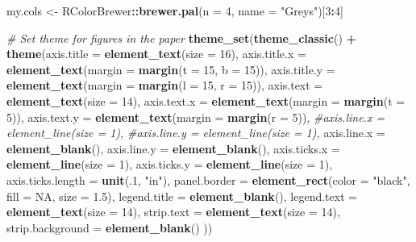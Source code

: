 \documentclass[]{article}
\newenvironment{Shaded}{\begin{snugshade}}{\end{snugshade}}
\newcommand{\CommentTok}[1]{\textcolor[rgb]{0.56,0.35,0.01}{\textit{#1}}}
\newcommand{\DataTypeTok}[1]{\textcolor[rgb]{0.13,0.29,0.53}{#1}}
\newcommand{\DecValTok}[1]{\textcolor[rgb]{0.00,0.00,0.81}{#1}}
\newcommand{\FloatTok}[1]{\textcolor[rgb]{0.00,0.00,0.81}{#1}}
\newcommand{\KeywordTok}[1]{\textcolor[rgb]{0.13,0.29,0.53}{\textbf{#1}}}
\newcommand{\NormalTok}[1]{#1}
\newcommand{\OperatorTok}[1]{\textcolor[rgb]{0.81,0.36,0.00}{\textbf{#1}}}
\newcommand{\OtherTok}[1]{\textcolor[rgb]{0.56,0.35,0.01}{#1}}
\newcommand{\StringTok}[1]{\textcolor[rgb]{0.31,0.60,0.02}{#1}}
\begin{document}
\begin{Shaded}
\begin{Highlighting}[]
\NormalTok{my.cols <-}\StringTok{ }\NormalTok{RColorBrewer}\OperatorTok{::}\KeywordTok{brewer.pal}\NormalTok{(}\DataTypeTok{n =} \DecValTok{4}\NormalTok{, }\DataTypeTok{name =} \StringTok{"Greys"}\NormalTok{)[}\DecValTok{3}\OperatorTok{:}\DecValTok{4}\NormalTok{]}

\CommentTok{# Set theme for figures in the paper}
\KeywordTok{theme_set}\NormalTok{(}\KeywordTok{theme_classic}\NormalTok{() }\OperatorTok{+}\StringTok{ }
\StringTok{  }\KeywordTok{theme}\NormalTok{(}\DataTypeTok{axis.title =} \KeywordTok{element_text}\NormalTok{(}\DataTypeTok{size =} \DecValTok{16}\NormalTok{),}
        \DataTypeTok{axis.title.x =} \KeywordTok{element_text}\NormalTok{(}\DataTypeTok{margin =} \KeywordTok{margin}\NormalTok{(}\DataTypeTok{t =} \DecValTok{15}\NormalTok{, }\DataTypeTok{b =} \DecValTok{15}\NormalTok{)),}
        \DataTypeTok{axis.title.y =} \KeywordTok{element_text}\NormalTok{(}\DataTypeTok{margin =} \KeywordTok{margin}\NormalTok{(}\DataTypeTok{l =} \DecValTok{15}\NormalTok{, }\DataTypeTok{r =} \DecValTok{15}\NormalTok{)),}
        \DataTypeTok{axis.text =} \KeywordTok{element_text}\NormalTok{(}\DataTypeTok{size =} \DecValTok{14}\NormalTok{),}
        \DataTypeTok{axis.text.x =} \KeywordTok{element_text}\NormalTok{(}\DataTypeTok{margin =} \KeywordTok{margin}\NormalTok{(}\DataTypeTok{t =} \DecValTok{5}\NormalTok{)),}
        \DataTypeTok{axis.text.y =} \KeywordTok{element_text}\NormalTok{(}\DataTypeTok{margin =} \KeywordTok{margin}\NormalTok{(}\DataTypeTok{r =} \DecValTok{5}\NormalTok{)),}
        \CommentTok{#axis.line.x = element_line(size = 1),}
        \CommentTok{#axis.line.y = element_line(size = 1),}
        \DataTypeTok{axis.line.x =} \KeywordTok{element_blank}\NormalTok{(),}
        \DataTypeTok{axis.line.y =} \KeywordTok{element_blank}\NormalTok{(),}
        \DataTypeTok{axis.ticks.x =} \KeywordTok{element_line}\NormalTok{(}\DataTypeTok{size =} \DecValTok{1}\NormalTok{),}
        \DataTypeTok{axis.ticks.y =} \KeywordTok{element_line}\NormalTok{(}\DataTypeTok{size =} \DecValTok{1}\NormalTok{),}
        \DataTypeTok{axis.ticks.length =} \KeywordTok{unit}\NormalTok{(.}\DecValTok{1}\NormalTok{, }\StringTok{"in"}\NormalTok{),}
        \DataTypeTok{panel.border =} \KeywordTok{element_rect}\NormalTok{(}\DataTypeTok{color =} \StringTok{"black"}\NormalTok{, }\DataTypeTok{fill =} \OtherTok{NA}\NormalTok{, }\DataTypeTok{size =} \FloatTok{1.5}\NormalTok{),}
        \DataTypeTok{legend.title =} \KeywordTok{element_blank}\NormalTok{(),}
        \DataTypeTok{legend.text =} \KeywordTok{element_text}\NormalTok{(}\DataTypeTok{size =} \DecValTok{14}\NormalTok{),}
        \DataTypeTok{strip.text =} \KeywordTok{element_text}\NormalTok{(}\DataTypeTok{size =} \DecValTok{14}\NormalTok{),}
        \DataTypeTok{strip.background =} \KeywordTok{element_blank}\NormalTok{()}
\NormalTok{        ))}
\end{Highlighting}
\end{Shaded}
\end{document}
